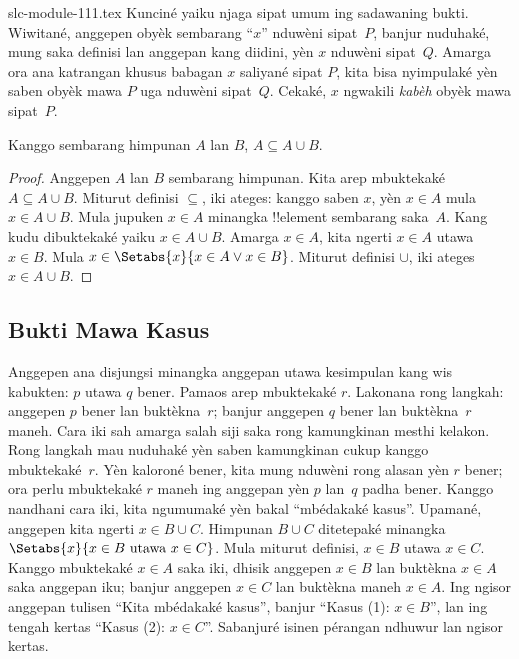 \begin{filecontents*}[overwrite]{slc-module-111.tex}
Kunciné yaiku njaga sipat umum ing sadawaning bukti. Wiwitané,
anggepen obyèk sembarang ``$x$'' nduwèni sipat~$P$, banjur
nuduhaké, mung saka definisi lan anggepan kang diidini, yèn
$x$ nduwèni sipat~$Q$. Amarga ora ana katrangan khusus babagan
$x$ saliyané sipat $P$, kita bisa nyimpulaké yèn saben obyèk
mawa $P$ uga nduwèni sipat~$Q$. Cekaké, $x$ ngwakili
\emph{kabèh} obyèk mawa sipat~$P$.

\begin{prop}
  Kanggo sembarang himpunan $A$ lan $B$, $A \subseteq A \cup B$.
\end{prop}

\begin{proof}
  Anggepen $A$ lan $B$ sembarang himpunan. Kita arep mbuktekaké
  $A \subseteq A \cup B$. Miturut definisi $\subseteq$, iki
  ateges: kanggo saben $x$, yèn $x \in A$ mula $x \in A \cup B$.
  Mula jupuken $x \in A$ minangka !!{element} sembarang saka~$A$.
  Kang kudu dibuktekaké yaiku $x \in A \cup B$. Amarga $x \in A$,
  kita ngerti $x \in A$ utawa $x \in B$. Mula $x \in
  \Setabs{x}{x \in A \lor x \in B}$. Miturut definisi $\cup$,
  iki ateges $x \in A \cup B$.
\end{proof}

\subsection{Bukti Mawa Kasus}

Anggepen ana disjungsi minangka anggepan utawa kesimpulan kang
wis kabukten: $p$ utawa $q$ bener. Pamaos arep mbuktekaké
$r$. Lakonana rong langkah: anggepen $p$ bener lan buktèkna~$r$;
banjur anggepen $q$ bener lan buktèkna~$r$ maneh. Cara iki sah
amarga salah siji saka rong kamungkinan mesthi kelakon. Rong
langkah mau nuduhaké yèn saben kamungkinan cukup kanggo
mbuktekaké~$r$. Yèn kaloroné bener, kita mung nduwèni rong
alasan yèn $r$ bener; ora perlu mbuktekaké $r$ maneh ing
anggepan yèn $p$ lan~$q$ padha bener. Kanggo nandhani cara iki,
kita ngumumaké yèn bakal ``mbédakaké kasus''. Upamané, anggepen
kita ngerti $x \in B \cup C$. Himpunan $B \cup C$
ditetepaké minangka $\Setabs{x}{x \in B \text{ utawa } x \in C}$.
Mula miturut definisi, $x \in B$ utawa $x \in C$.
Kanggo mbuktekaké $x \in A$ saka iki, dhisik anggepen $x \in B$
lan buktèkna $x \in A$ saka anggepan iku; banjur anggepen
$x \in C$ lan buktèkna maneh $x \in A$. Ing ngisor anggepan
tulisen ``Kita mbédakaké kasus'', banjur ``Kasus (1): $x \in B$'',
lan ing tengah kertas ``Kasus (2): $x \in C$''. Sabanjuré
isinen pérangan ndhuwur lan ngisor kertas.


\end{filecontents*}
